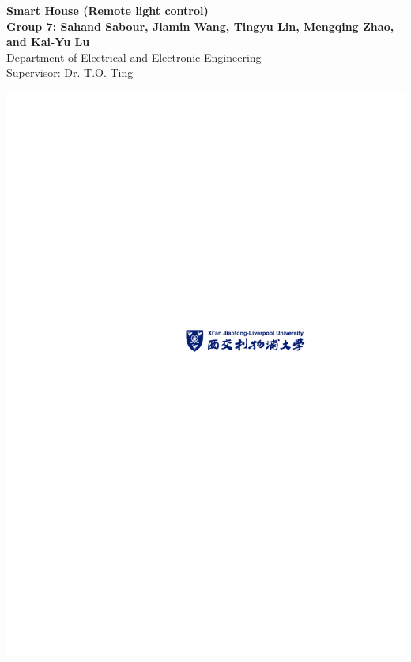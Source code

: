 \documentclass[a0,portrait]{a0poster}
\begin{document}


\begin{minipage}[b]{0.75\linewidth}
\veryHuge \color{NavyBlue} \textbf{Smart House (Remote light control)} \color{Black}\\ %

\huge \textbf{Group 7: Sahand Sabour, Jiamin Wang, Tingyu Lin, Mengqing Zhao, and Kai-Yu Lu}\\[0.5cm] %
\huge Department of Electrical and Electronic Engineering\\[0.4cm] %
\huge Supervisor: Dr. T.O. Ting\\
\end{minipage}
%
\begin{minipage}[b]{0.25\linewidth}
\includegraphics[scale=2.8]{img/logo}\\
\end{minipage}
\end{document}
